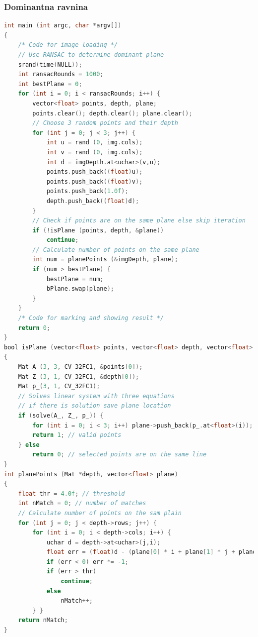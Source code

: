\subsubsection{Dominantna ravnina}
\begin{lstlisting}[language=C,caption={Dominant plane}]
int main (int argc, char *argv[])
{
    /* Code for image loading */
    // Use RANSAC to determine dominant plane
    srand(time(NULL));
    int ransacRounds = 1000;
    int bestPlane = 0;
    for (int i = 0; i < ransacRounds; i++) {
        vector<float> points, depth, plane;
        points.clear(); depth.clear(); plane.clear();
        // Choose 3 random points and their depth
        for (int j = 0; j < 3; j++) {
            int u = rand (0, img.cols);
            int v = rand (0, img.cols);
            int d = imgDepth.at<uchar>(v,u);
            points.push_back((float)u);
            points.push_back((float)v);
            points.push_back(1.0f);
            depth.push_back((float)d);
        }
        // Check if points are on the same plane else skip iteration
        if (!isPlane (points, depth, &plane))
            continue; 
        // Calculate number of points on the same plane
        int num = planePoints (&imgDepth, plane);
        if (num > bestPlane) {
            bestPlane = num;
            bPlane.swap(plane);
        }
    }
    /* Code for marking and showing result */
    return 0;
}
bool isPlane (vector<float> points, vector<float> depth, vector<float> *plane) 
{
    Mat A_(3, 3, CV_32FC1, &points[0]);
    Mat Z_(3, 1, CV_32FC1, &depth[0]);
    Mat p_(3, 1, CV_32FC1);
    // Solves linear system with three equations
    // if there is solution save plane location
    if (solve(A_, Z_, p_)) {
        for (int i = 0; i < 3; i++) plane->push_back(p_.at<float>(i));
        return 1; // valid points
    } else
        return 0; // selected points are on the same line
}
int planePoints (Mat *depth, vector<float> plane) 
{
    float thr = 4.0f; // threshold
    int nMatch = 0; // number of matches
    // Calculate number of points on the sam plain
    for (int j = 0; j < depth->rows; j++) {
        for (int i = 0; i < depth->cols; i++) {
            uchar d = depth->at<uchar>(j,i);
            float err = (float)d - (plane[0] * i + plane[1] * j + plane[2]);
            if (err < 0) err *= -1;
            if (err > thr)
                continue;
            else
                nMatch++;
        } }
    return nMatch;
}
\end{lstlisting}

